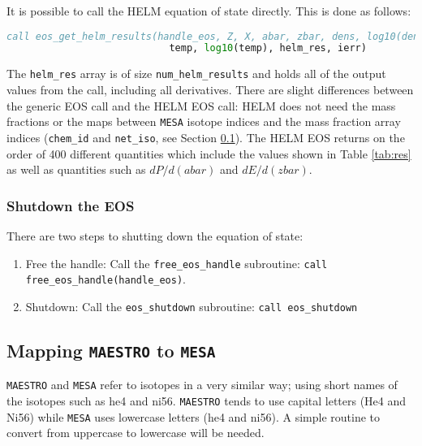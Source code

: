 It is possible to call the HELM equation of state directly. This is done as 
follows:
\begin{lstlisting}[language=fortran,mathescape=false]
  call eos_get_helm_results(handle_eos, Z, X, abar, zbar, dens, log10(dens), &
                            temp, log10(temp), helm_res, ierr)
\end{lstlisting}
The {\tt helm\_res} array is of size {\tt num\_helm\_results} and holds all 
of the output 
values from the call, including all derivatives. 
There are slight differences between the generic EOS call and the HELM EOS 
call: HELM does not need the mass fractions or the maps between 
{\tt MESA} isotope indices and the mass fraction array indices ({\tt chem\_id} 
and {\tt net\_iso}, see Section \ref{sec:mapping}). The HELM EOS returns on 
the order of 400 different quantities which include the values shown in 
Table \ref{tab:res} as well as quantities such as $dP/d(abar)$ and 
$dE/d(zbar)$. 

\subsubsection{Shutdown the EOS}

There are two steps to shutting down the equation of state:
\begin{enumerate}
\item Free the handle: Call the {\tt free\_eos\_handle} subroutine: 
{\tt call free\_eos\_handle(handle\_eos)}.

\item Shutdown: Call the {\tt eos\_shutdown} subroutine: 
{\tt call eos\_shutdown}
\end{enumerate}


\subsection{Mapping {\tt MAESTRO} to {\tt MESA}}
\label{sec:mapping}

{\tt MAESTRO} and {\tt MESA} refer to isotopes in a very similar way; using 
short names of the isotopes such as he4 and ni56. {\tt MAESTRO} 
tends to use capital letters (He4 and Ni56) while {\tt MESA} uses 
lowercase letters (he4 and ni56). A simple routine to convert from 
uppercase to lowercase will be needed.

